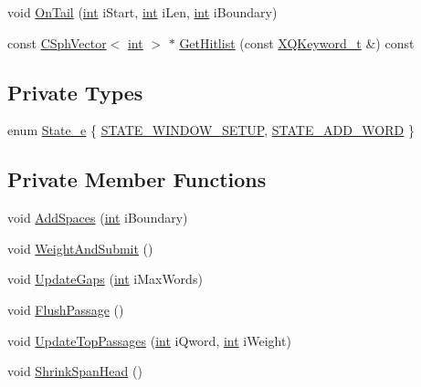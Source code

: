 \begin{DoxyCompactItemize}
\item 
void \hyperlink{classExtractExcerpts__c_a368ee590a2cb8eb884fc1982ab88dc98}{On\-Tail} (\hyperlink{sphinxexpr_8cpp_a4a26e8f9cb8b736e0c4cbf4d16de985e}{int} i\-Start, \hyperlink{sphinxexpr_8cpp_a4a26e8f9cb8b736e0c4cbf4d16de985e}{int} i\-Len, \hyperlink{sphinxexpr_8cpp_a4a26e8f9cb8b736e0c4cbf4d16de985e}{int} i\-Boundary)
\item 
const \hyperlink{classCSphVector}{C\-Sph\-Vector}$<$ \hyperlink{sphinxexpr_8cpp_a4a26e8f9cb8b736e0c4cbf4d16de985e}{int} $>$ $\ast$ \hyperlink{classExtractExcerpts__c_a0957a9045509b64507cda111bc5c252d}{Get\-Hitlist} (const \hyperlink{structXQKeyword__t}{X\-Q\-Keyword\-\_\-t} \&) const 
\end{DoxyCompactItemize}
\subsection*{Private Types}
\begin{DoxyCompactItemize}
\item 
enum \hyperlink{classExtractExcerpts__c_a393a79623916648bf0ca6d34fcd784e0}{State\-\_\-e} \{ \hyperlink{classExtractExcerpts__c_a393a79623916648bf0ca6d34fcd784e0a0b659f2440727a7c40dab440038b5750}{S\-T\-A\-T\-E\-\_\-\-W\-I\-N\-D\-O\-W\-\_\-\-S\-E\-T\-U\-P}, 
\hyperlink{classExtractExcerpts__c_a393a79623916648bf0ca6d34fcd784e0a92b7a3f8508374c10ef41f60c8e0a072}{S\-T\-A\-T\-E\-\_\-\-A\-D\-D\-\_\-\-W\-O\-R\-D}
 \}
\end{DoxyCompactItemize}
\subsection*{Private Member Functions}
\begin{DoxyCompactItemize}
\item 
void \hyperlink{classExtractExcerpts__c_a792b9f685a670bc9d69c60dc568e6835}{Add\-Spaces} (\hyperlink{sphinxexpr_8cpp_a4a26e8f9cb8b736e0c4cbf4d16de985e}{int} i\-Boundary)
\item 
void \hyperlink{classExtractExcerpts__c_ad76d3a5d1a61c4cc752fa6e3803a6af4}{Weight\-And\-Submit} ()
\item 
void \hyperlink{classExtractExcerpts__c_a77ed7b06c08d4ac35839d27d36879061}{Update\-Gaps} (\hyperlink{sphinxexpr_8cpp_a4a26e8f9cb8b736e0c4cbf4d16de985e}{int} i\-Max\-Words)
\item 
void \hyperlink{classExtractExcerpts__c_a7fb2fb557292f41e8d49122ee43c4825}{Flush\-Passage} ()
\item 
void \hyperlink{classExtractExcerpts__c_a14fd60bb7c9079e35ff38afaf731dd51}{Update\-Top\-Passages} (\hyperlink{sphinxexpr_8cpp_a4a26e8f9cb8b736e0c4cbf4d16de985e}{int} i\-Qword, \hyperlink{sphinxexpr_8cpp_a4a26e8f9cb8b736e0c4cbf4d16de985e}{int} i\-Weight)
\item 
void \hyperlink{classExtractExcerpts__c_afdd24bee82448e6599bdb810b6ebd2e2}{Shrink\-Span\-Head} ()
\end{DoxyCompactItemize}
